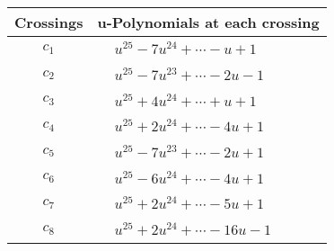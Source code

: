 \documentclass[1p]{elsarticle_modified}
\theoremstyle{definition}
\begin{document}
\begin{tabular}{m{50pt}|m{274pt}}
Crossings & \hspace{64pt}u-Polynomials at each crossing \\
\hline $$\begin{aligned}c_{1}\end{aligned}$$&$\begin{aligned}
&u^{25}-7 u^{24}+\cdots- u+1
\end{aligned}$\\
\hline $$\begin{aligned}c_{2}\end{aligned}$$&$\begin{aligned}
&u^{25}-7 u^{23}+\cdots-2 u-1
\end{aligned}$\\
\hline $$\begin{aligned}c_{3}\end{aligned}$$&$\begin{aligned}
&u^{25}+4 u^{24}+\cdots+u+1
\end{aligned}$\\
\hline $$\begin{aligned}c_{4}\end{aligned}$$&$\begin{aligned}
&u^{25}+2 u^{24}+\cdots-4 u+1
\end{aligned}$\\
\hline $$\begin{aligned}c_{5}\end{aligned}$$&$\begin{aligned}
&u^{25}-7 u^{23}+\cdots-2 u+1
\end{aligned}$\\
\hline $$\begin{aligned}c_{6}\end{aligned}$$&$\begin{aligned}
&u^{25}-6 u^{24}+\cdots-4 u+1
\end{aligned}$\\
\hline $$\begin{aligned}c_{7}\end{aligned}$$&$\begin{aligned}
&u^{25}+2 u^{24}+\cdots-5 u+1
\end{aligned}$\\
\hline $$\begin{aligned}c_{8}\end{aligned}$$&$\begin{aligned}
&u^{25}+2 u^{24}+\cdots-16 u-1
\end{aligned}$\\

\end{tabular}
\end{document}
